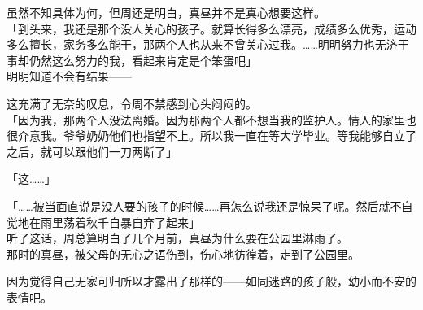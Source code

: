 虽然不知具体为何，但周还是明白，真昼并不是真心想要这样。\\

「到头来，我还是那个没人关心的孩子。就算长得多么漂亮，成绩多么优秀，运动多么擅长，家务多么能干，那两个人也从来不曾关心过我。……明明努力也无济于事却仍然这么努力的我，看起来肯定是个笨蛋吧」\\

明明知道不会有结果——

这充满了无奈的叹息，令周不禁感到心头闷闷的。\\

「因为我，那两个人没法离婚。因为那两个人都不想当我的监护人。情人的家里也很介意我。爷爷奶奶他们也指望不上。所以我一直在等大学毕业。等我能够自立了之后，就可以跟他们一刀两断了」

「这……」

「……被当面直说是没人要的孩子的时候……再怎么说我还是惊呆了呢。然后就不自觉地在雨里荡着秋千自暴自弃了起来」\\

听了这话，周总算明白了几个月前，真昼为什么要在公园里淋雨了。\\

那时的真昼，被父母的无心之语伤到，伤心地彷徨着，走到了公园里。

因为觉得自己无家可归所以才露出了那样的——如同迷路的孩子般，幼小而不安的表情吧。\\

